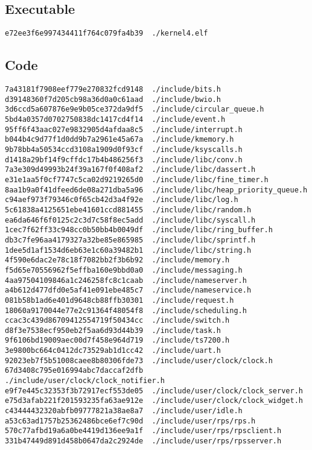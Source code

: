 \documentclass{article}
\begin{document}
\subsection{Executable}
\begin{verbatim}
e72ee3f6e997434411f764c079fa4b39  ./kernel4.elf
\end{verbatim}

\subsection{Code}
\begin{verbatim}
7a43181f7908eef779e270832fcd9148  ./include/bits.h
d39148360f7d205cb98a36d0a0c61aad  ./include/bwio.h
3d6ccd5a607876e9e9b05ce372da9df5  ./include/circular_queue.h
5bd4a0357d0702750838dc1417cd4f14  ./include/event.h
95ff6f43aac027e9832905d4afdaa8c5  ./include/interrupt.h
b044b4c9d77f1d0dd9b7a2961e45a67a  ./include/kmemory.h
9b78bb4a50534ccd3108a1909d0f93cf  ./include/ksyscalls.h
d1418a29bf14f9cffdc17b4b486256f3  ./include/libc/conv.h
7a3e309d49993b24f39a167f0f408af2  ./include/libc/dassert.h
e31e1aa5f0cf7747c5ca02d9219265d0  ./include/libc/fine_timer.h
8aa1b9a0f41dfeed6de08a271dba5a96  ./include/libc/heap_priority_queue.h
c94aef973f79346c0f65cb42d3a4f92e  ./include/libc/log.h
5c61838a4125651ebe41601ccd881455  ./include/libc/random.h
ea6da646f6f0125c2c3d7c58f8ec5add  ./include/libc/syscall.h
1cec7f62ff33c948cc0b50bb4b0049df  ./include/libc/ring_buffer.h
db3c7fe96aa4179327a32be85e865985  ./include/libc/sprintf.h
1dee5d1af1534d6eb63e1c60a39482b1  ./include/libc/string.h
4f590e6dac2e78c18f7082bb2f3b6b92  ./include/memory.h
f5d65e70556962f5effba160e9bbd0a0  ./include/messaging.h
4aa97504109846a1c246258fc8c1caab  ./include/nameserver.h
a4b612d477dfd0e5af41e091ebe485c7  ./include/nameservice.h
081b58b1ad6e401d9648cb88ffb30301  ./include/request.h
18060a9170044e77e2c91364f48054f8  ./include/scheduling.h
ccac3c439d86709412554719f50434cc  ./include/switch.h
d8f3e7538ecf950eb2f5aa6d93d44b39  ./include/task.h
9f6106bd19009aec00d7f458e964d719  ./include/ts7200.h
3e9800bc664c0412dc73529ab1d1cc42  ./include/uart.h
92023eb7f5b51008caee8b80306fde73  ./include/user/clock/clock.h
67d3408c795e016994abc7daccaf2dfb  ./include/user/clock/clock_notifier.h
e9f7e445c32353f3b72917ecf553de05  ./include/user/clock/clock_server.h
e75d3afab221f201593235fa63ae912e  ./include/user/clock/clock_widget.h
c43444432320abfb09777821a38ae8a7  ./include/user/idle.h
a53c63ad1757b25362486bce6ef7c90d  ./include/user/rps/rps.h
570c77afbd19a6a0be4419d136ee9a1f  ./include/user/rps/rpsclient.h
331b47449d891d458b0647da2c2924de  ./include/user/rps/rpsserver.h

\end{verbatim}
\end{document}

